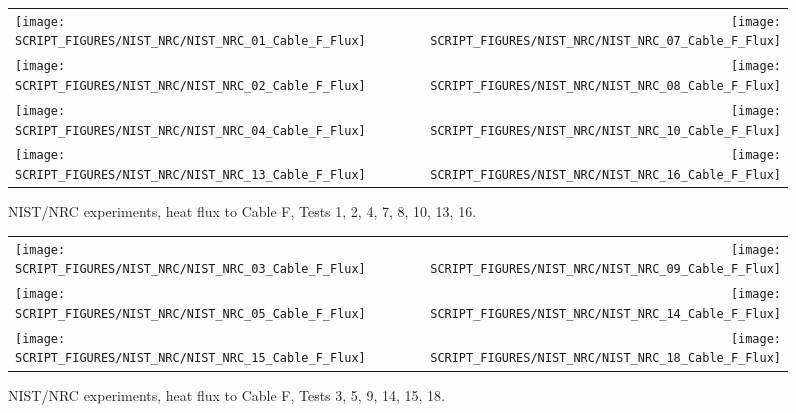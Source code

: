 \begin{figure}[p]
\begin{tabular*}{\textwidth}{l@{\extracolsep{\fill}}r}
\texttt{[image: SCRIPT\_FIGURES/NIST\_NRC/NIST\_NRC\_01\_Cable\_F\_Flux]} &
\texttt{[image: SCRIPT\_FIGURES/NIST\_NRC/NIST\_NRC\_07\_Cable\_F\_Flux]} \\
\texttt{[image: SCRIPT\_FIGURES/NIST\_NRC/NIST\_NRC\_02\_Cable\_F\_Flux]} &
\texttt{[image: SCRIPT\_FIGURES/NIST\_NRC/NIST\_NRC\_08\_Cable\_F\_Flux]} \\
\texttt{[image: SCRIPT\_FIGURES/NIST\_NRC/NIST\_NRC\_04\_Cable\_F\_Flux]} &
\texttt{[image: SCRIPT\_FIGURES/NIST\_NRC/NIST\_NRC\_10\_Cable\_F\_Flux]} \\
\texttt{[image: SCRIPT\_FIGURES/NIST\_NRC/NIST\_NRC\_13\_Cable\_F\_Flux]} &
\texttt{[image: SCRIPT\_FIGURES/NIST\_NRC/NIST\_NRC\_16\_Cable\_F\_Flux]}
\end{tabular*}
\caption[NIST/NRC experiments, heat flux to Cable F, Tests 1, 2, 4, 7, 8, 10, 13, 16]
{NIST/NRC experiments, heat flux to Cable F, Tests 1, 2, 4, 7, 8, 10, 13, 16.}
\label{NIST_NRC_Cable_F_Flux_Closed}
\end{figure}

\begin{figure}[p]
\begin{tabular*}{\textwidth}{l@{\extracolsep{\fill}}r}
\texttt{[image: SCRIPT\_FIGURES/NIST\_NRC/NIST\_NRC\_03\_Cable\_F\_Flux]} &
\texttt{[image: SCRIPT\_FIGURES/NIST\_NRC/NIST\_NRC\_09\_Cable\_F\_Flux]} \\
\texttt{[image: SCRIPT\_FIGURES/NIST\_NRC/NIST\_NRC\_05\_Cable\_F\_Flux]} &
\texttt{[image: SCRIPT\_FIGURES/NIST\_NRC/NIST\_NRC\_14\_Cable\_F\_Flux]} \\
\texttt{[image: SCRIPT\_FIGURES/NIST\_NRC/NIST\_NRC\_15\_Cable\_F\_Flux]} &
\texttt{[image: SCRIPT\_FIGURES/NIST\_NRC/NIST\_NRC\_18\_Cable\_F\_Flux]}
\end{tabular*}
\caption[NIST/NRC experiments, heat flux to Cable F, Tests 3, 5, 9, 14, 15, 18]
{NIST/NRC experiments, heat flux to Cable F, Tests 3, 5, 9, 14, 15, 18.}
\label{NIST_NRC_Cable_F_Flux_Open}
\end{figure}

